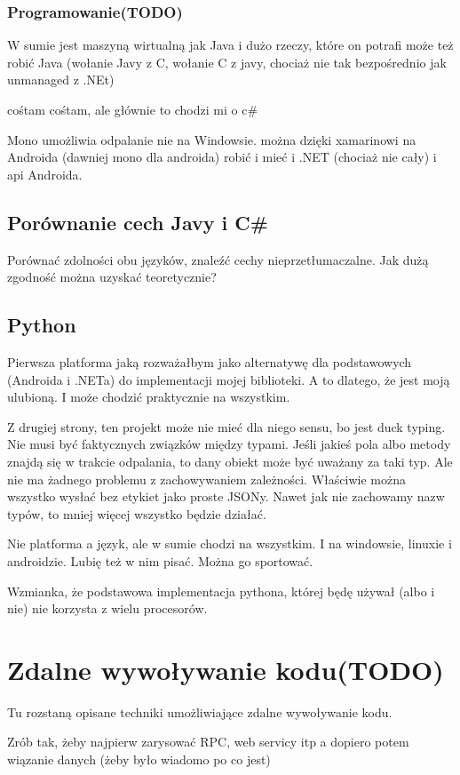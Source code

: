 \subsubsection{Programowanie(TODO)}
W sumie jest maszyną wirtualną jak Java i dużo rzeczy, które on potrafi może też robić Java (wołanie Javy z C, wołanie C z javy, chociaż nie tak bezpośrednio jak unmanaged z .NEt)

cośtam cośtam, ale głównie to chodzi mi o c\#

Mono umożliwia odpalanie nie na Windowsie.
można dzięki xamarinowi na Androida (dawniej mono dla androida) robić i mieć i .NET (chociaż nie cały) i api Androida.

\subsection{Porównanie cech Javy i C\#}
Porównać zdolności obu języków, znaleźć cechy nieprzetłumaczalne. Jak dużą zgodność można uzyskać teoretycznie?

\subsection{Python}
Pierwsza platforma jaką rozważałbym jako alternatywę dla podstawowych (Androida i .NETa) do implementacji mojej biblioteki. A to dlatego, że jest moją ulubioną. I może chodzić praktycznie na wszystkim.

Z drugiej strony, ten projekt może nie mieć dla niego sensu, bo jest duck typing. Nie musi być faktycznych związków między typami. Jeśli jakieś pola albo metody znajdą się w trakcie odpalania, to dany obiekt może być uważany za taki typ. Ale nie ma żadnego problemu z zachowywaniem zależności. Właściwie można wszystko wysłać bez etykiet jako proste JSONy. Nawet jak nie zachowamy nazw typów, to mniej więcej wszystko będzie działać.

Nie platforma a język, ale w sumie chodzi na wszystkim. I na windowsie, linuxie i androidzie. Lubię też w nim pisać. Można go sportować.

Wzmianka, że podstawowa implementacja pythona, której będę używał (albo i nie) nie korzysta z wielu procesorów.

\section{Zdalne wywoływanie kodu(TODO)}
Tu rozstaną opisane techniki umożliwiające zdalne wywoływanie kodu.

Zrób tak, żeby najpierw zarysować RPC, web servicy itp a dopiero potem wiązanie danych (żeby było wiadomo po co jest)

